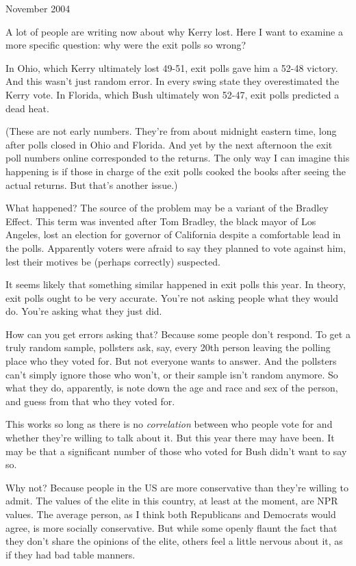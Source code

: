 \documentclass[12pt]{book}
\begin{document}
November 2004

A lot of people are writing now about why Kerry lost. Here I want to
examine a more specific question: why were the exit polls so wrong?

In Ohio, which Kerry ultimately lost 49-51, exit polls gave him a 52-48
victory. And this wasn't just random error. In every swing state they
overestimated the Kerry vote. In Florida, which Bush ultimately won
52-47, exit polls predicted a dead heat.

(These are not early numbers. They're from about midnight eastern time,
long after polls closed in Ohio and Florida. And yet by the next
afternoon the exit poll numbers online corresponded to the returns. The
only way I can imagine this happening is if those in charge of the exit
polls cooked the books after seeing the actual returns. But that's
another issue.)

What happened? The source of the problem may be a variant of the Bradley
Effect. This term was invented after Tom Bradley, the black mayor of Los
Angeles, lost an election for governor of California despite a
comfortable lead in the polls. Apparently voters were afraid to say they
planned to vote against him, lest their motives be (perhaps correctly)
suspected.

It seems likely that something similar happened in exit polls this year.
In theory, exit polls ought to be very accurate. You're not asking
people what they would do. You're asking what they just did.

How can you get errors asking that? Because some people don't respond.
To get a truly random sample, pollsters ask, say, every 20th person
leaving the polling place who they voted for. But not everyone wants to
answer. And the pollsters can't simply ignore those who won't, or their
sample isn't random anymore. So what they do, apparently, is note down
the age and race and sex of the person, and guess from that who they
voted for.

This works so long as there is no \emph{correlation} between who people
vote for and whether they're willing to talk about it. But this year
there may have been. It may be that a significant number of those who
voted for Bush didn't want to say so.

Why not? Because people in the US are more conservative than they're
willing to admit. The values of the elite in this country, at least at
the moment, are NPR values. The average person, as I think both
Republicans and Democrats would agree, is more socially conservative.
But while some openly flaunt the fact that they don't share the opinions
of the elite, others feel a little nervous about it, as if they had bad
table manners.
\end{document}

